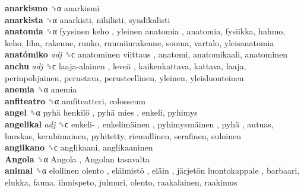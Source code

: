 \textbf{anarkismo} ␝α  anarkismi  \\
\textbf{anarkista} ␝α  anarkisti, nihilisti, syndikalisti  \\
\textbf{anatomia} ␝α   fyysinen keho ,  yleinen anatomia , anatomia, fysiikka, hahmo, keho, liha, rakenne, runko, ruumiinrakenne, sooma, vartalo, yleisanatomia  \\
\textbf{anatómiko} \emph{adj}  ␝ϲ   anatominen viittaus , anatomi, anatomikaali, anatominen  \\
\textbf{anchu} \emph{adj}  ␝ϲ   laaja-alainen ,  leveä , kaikenkattava, kattava, laaja, perinpohjainen, perustava, perusteellinen, yleinen, yleisluonteinen  \\
\textbf{anemia} ␝α  anemia  \\
\textbf{anfiteatro} ␝α  amfiteatteri, colosseum  \\
\textbf{angel} ␝α   pyhä henkilö ,  pyhä mies , enkeli, pyhimys  \\
\textbf{angelikal} \emph{adj}  ␝ϲ   enkeli- ,  enkelimäinen ,  pyhimysmäinen ,  pyhä , autuas, hurskas, kerubimainen, pyhitetty, riemullinen, serafinen, suloinen  \\
\textbf{anglikano} ␝ϲ  anglikaani, anglikaaninen  \\
\textbf{Angola} ␝α   Angola ,  Angolan tasavalta   \\
\textbf{animal} ␝α   elollinen olento ,  eläimistö ,  eläin ,  järjetön luontokappale , barbaari, elukka, fauna, ihmispeto, julmuri, olento, raakalainen, raakimus  \\
